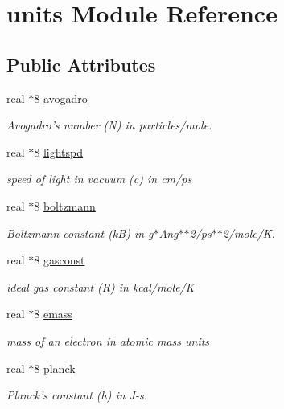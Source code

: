 \hypertarget{classunits}{\section{units Module Reference}
\label{classunits}
}
\subsection*{Public Attributes}
\begin{DoxyCompactItemize}
\item 
real $\ast$8 \hyperlink{classunits_a24d813d40280b903eea6533f0b044ba9}{avogadro}
\begin{DoxyCompactList}\small\item\em Avogadro's number (N) in particles/mole. \end{DoxyCompactList}\item 
real $\ast$8 \hyperlink{classunits_a2403d87e6803bf101270cc60d99f44bf}{lightspd}
\begin{DoxyCompactList}\small\item\em speed of light in vacuum (c) in cm/ps \end{DoxyCompactList}\item 
real $\ast$8 \hyperlink{classunits_acd591c79c4ec7abdaa2bed6d0918be75}{boltzmann}
\begin{DoxyCompactList}\small\item\em Boltzmann constant (k\-B) in g$\ast$\-Ang$\ast$$\ast$2/ps$\ast$$\ast$2/mole/\-K. \end{DoxyCompactList}\item 
real $\ast$8 \hyperlink{classunits_a080df35cda27aecee672841a1cde2f44}{gasconst}
\begin{DoxyCompactList}\small\item\em ideal gas constant (R) in kcal/mole/\-K \end{DoxyCompactList}\item 
real $\ast$8 \hyperlink{classunits_a991c951488296bc2396563916f2c5e66}{emass}
\begin{DoxyCompactList}\small\item\em mass of an electron in atomic mass units \end{DoxyCompactList}\item 
real $\ast$8 \hyperlink{classunits_a89f1a1ae7ff5ffa457cd0f11b2ddfb60}{planck}
\begin{DoxyCompactList}\small\item\em Planck's constant (h) in J-\/s. \end{DoxyCompactList}\item 

\end{DoxyCompactItemize}
